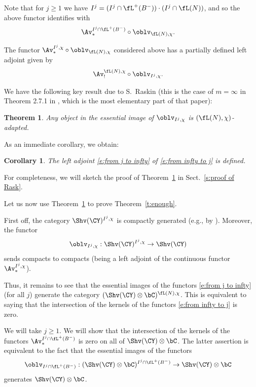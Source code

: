 \documentclass[9pt]{amsart}
\newtheorem{cor}[subsubsection]{Corollary}
\newtheorem{thm}[subsubsection]{Theorem}
\theoremstyle{definition}
\theoremstyle{remark}
\newcommand{\thmref}[1]{Theorem~\ref{#1}}
\newcommand{\secref}[1]{Sect.~\ref{#1}}
\numberwithin{equation}{section}
\begin{document}
Note that for $j\geq 1$ we have $I^j=(I^j\cap \fL^+(B^-))\cdot (I^j\cap \fL(N))$, and so the above functor identifies with
$$\Av^{I^j\cap \fL^+(B^-)}_*\circ \oblv_{\fL(N),\chi}.$$

\medskip

The functor $\Av^{I^j,\chi}_*\circ \oblv_{\fL(N),\chi}$ considered above has a partially defined left adjoint given by
\begin{equation} \label{e:from j to infty}
\Av^{\fL(N),\chi}_!\circ \oblv_{I^j,\chi}.
\end{equation} 

\sssec{}

We have the following key result due to S.~Raskin (this is the case of $m=\infty$ in Theorem 2.7.1 in \cite{Ras}, which
is the most elementary part of that paper): 

\begin{thm} \label{t:Raskin} 
Any object in the essential image of $\oblv_{I^j,\chi}$ is $(\fL(N),\chi)$-adapted.
\end{thm}

As an immediate corollary, we obtain:

\begin{cor} 
The left adjoint \eqref{e:from j to infty} of \eqref{e:from infty to j} is defined.
\end{cor} 

For completeness, we will sketch the proof of \thmref{t:Raskin} in \secref{s:proof of Rask}.

\sssec{} \label{sss:proof of enough}

Let us now use \thmref{t:Raskin} to prove \thmref{t:enough}. 

\medskip

First off, the category $\Shv(\CY)^{I^j,\chi}$ is compactly generated (e.g., by \cite{DrGa}). 
Moreover, the functor 
$$\oblv_{I^j,\chi}:\Shv(\CY)^{I^j,\chi}\to \Shv(\CY)$$
sends compacts to compacts (being a left adjoint of the continuous functor $\Av^{I^j,\chi}_*$). 

\medskip

Thus, it remains to see that the essential images of the functors \eqref{e:from j to infty} (for all $j$)
generate the category $(\Shv(\CY)\otimes \bC)^{\fL(N),\chi}$. This is equivalent to saying that the
intersection of the kernels of the functors \eqref{e:from infty to j} is zero. 

\medskip

We will take $j\geq 1$. We will show that the intersection of the kernels of the functors
$\Av^{I^j\cap \fL^+(B^-)}_*$ is zero on all of $\Shv(\CY)\otimes \bC$. The latter assertion
is equivalent to the fact that the essential images of the functors
$$\oblv_{I^j\cap \fL^+(B^-)}:(\Shv(\CY)\otimes \bC)^{I^j\cap \fL^+(B^-)}\to \Shv(\CY)\otimes \bC$$
generates $\Shv(\CY)\otimes \bC$. 
\end{document}

